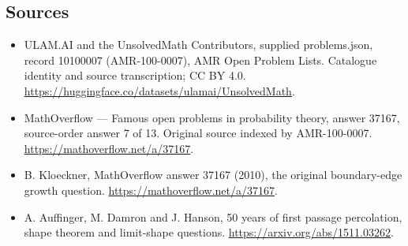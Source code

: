 \documentclass[11pt,a4paper]{article}
\begin{document}
\subsection{Sources}
\begin{itemize}
\item[S1] ULAM.AI and the UnsolvedMath Contributors, supplied problems.json, record 10100007 (AMR-100-0007), AMR Open Problem Lists. Catalogue identity and source transcription; CC BY 4.0.
\url{https://huggingface.co/datasets/ulamai/UnsolvedMath}.
\item[S2] MathOverflow — Famous open problems in probability theory, answer 37167, source-order answer 7 of 13. Original source indexed by AMR-100-0007.
\url{https://mathoverflow.net/a/37167}.
\item[S3] B. Kloeckner, MathOverflow answer 37167 (2010), the original boundary-edge growth question.
\url{https://mathoverflow.net/a/37167}.
\item[S4] A. Auffinger, M. Damron and J. Hanson, 50 years of first passage percolation, shape theorem and limit-shape questions.
\url{https://arxiv.org/abs/1511.03262}.
\end{itemize}
\end{document}

